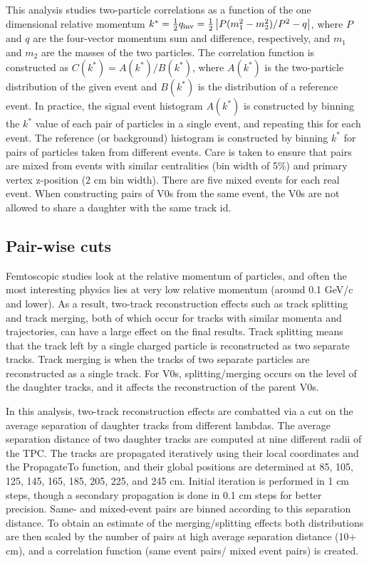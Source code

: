 This analysis studies two-particle correlations as a function of the one dimensional relative momentum $k^*=\frac{1}{2}q_{\mathrm{inv}}=\frac{1}{2}\left\lvert P(m^2_1-m^2_2)/P^2 - q\right\rvert$, where $P$ and $q$ are the four-vector momentum sum and difference, respectively, and $m_1$ and $m_2$ are the masses of the two particles.  The correlation function is constructed as $C(k^*) = A(k^*)/B(k^*)$, where $A(k^*)$ is the two-particle distribution of the given event and $B(k^*)$ is the distribution of a reference event.  In practice, the signal event histogram $A(k^*)$ is constructed by binning the $k^*$ value of each pair of particles in a single event, and repeating this for each event.  The reference (or background) histogram is constructed by binning $k^*$ for pairs of particles taken from different events.  Care is taken to ensure that pairs are mixed from events with similar centralities (bin width of 5\%) and primary vertex z-position (2 cm bin width).  There are five mixed events for each real event.  When constructing pairs of V0s from the same event, the V0s are not allowed to share a daughter with the same track id. 

\subsection{Pair-wise cuts}
\label{sec:PairWiseCuts}

Femtoscopic studies look at the relative momentum of particles, and often the most interesting physics lies at very low relative momentum (around 0.1 GeV/c and lower).  As a result, two-track reconstruction effects such as track splitting and track merging, both of which occur for tracks with similar momenta and trajectories, can have a large effect on the final results.  Track splitting means that the track left by a single charged particle is reconstructed as two separate tracks. Track merging is when the tracks of two separate particles are reconstructed as a single track.  For V0s, splitting/merging occurs on the level of the daughter tracks, and it affects the reconstruction of the parent V0s.

In this analysis, two-track reconstruction effects are combatted via a cut on the average separation of daughter tracks from different lambdas.  The average separation distance of two daughter tracks are computed at nine different radii of the TPC.  The tracks are propagated iteratively using their local coordinates and the PropagateTo function, and their global positions are determined at 85, 105, 125, 145, 165, 185, 205, 225, and 245 cm.  Initial iteration is performed in 1 cm steps, though a secondary propagation is done in 0.1 cm steps for better precision.  Same- and mixed-event pairs are binned according to this separation distance.  To obtain an estimate of the merging/splitting effects both distributions are then scaled by the number of pairs at high average separation distance (10+ cm), and a correlation function (same event pairs/ mixed event pairs) is created. 

